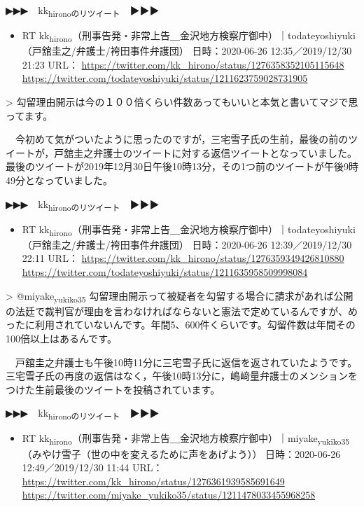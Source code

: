 \documentclass[]{ltjarticle}
\begin{document}
▶▶▶　kk\textsubscript{hironoのリツイート}　▶▶▶  

\begin{itemize}
\item RT kk\textsubscript{hirono}（刑事告発・非常上告＿金沢地方検察庁御中）｜todateyoshiyuki（戸舘圭之/弁護士/袴田事件弁護団） 日時：2020-06-26 12:35／2019/12/30 21:23 URL： \url{https://twitter.com/kk\_hirono/status/1276358352105115648} \url{https://twitter.com/todateyoshiyuki/status/1211623759028731905}
\end{itemize}

> 勾留理由開示は今の１００倍くらい件数あってもいいと本気と書いてマジで思ってます。  

　今初めて気がついたように思ったのですが，三宅雪子氏の生前，最後の前のツイートが，戸舘圭之弁護士のツイートに対する返信ツイートとなっていました。最後のツイートが2019年12月30日午後10時13分，その1つ前のツイートが午後9時49分となっていました。

▶▶▶　kk\textsubscript{hironoのリツイート}　▶▶▶  

\begin{itemize}
\item RT kk\textsubscript{hirono}（刑事告発・非常上告＿金沢地方検察庁御中）｜todateyoshiyuki（戸舘圭之/弁護士/袴田事件弁護団） 日時：2020-06-26 12:39／2019/12/30 22:11 URL： \url{https://twitter.com/kk\_hirono/status/1276359349426810880} \url{https://twitter.com/todateyoshiyuki/status/1211635958509998084}
\end{itemize}

> @miyake\textsubscript{yukiko35} 勾留理由開示って被疑者を勾留する場合に請求があれば公開の法廷で裁判官が理由を言わなければならないと憲法で定めているんですが、めったに利用されていないんです。年間5、600件くらいです。勾留件数は年間その100倍以上はあるんです。  

　戸舘圭之弁護士も午後10時11分に三宅雪子氏に返信を返されていたようです。三宅雪子氏の再度の返信はなく，午後10時13分に，嶋﨑量弁護士のメンションをつけた生前最後のツイートを投稿されています。

▶▶▶　kk\textsubscript{hironoのリツイート}　▶▶▶  

\begin{itemize}
\item RT kk\textsubscript{hirono}（刑事告発・非常上告＿金沢地方検察庁御中）｜miyake\textsubscript{yukiko35}（みやけ雪子（世の中を変えるために声をあげよう）） 日時：2020-06-26 12:49／2019/12/30 11:44 URL： \url{https://twitter.com/kk\_hirono/status/1276361939585691649} \url{https://twitter.com/miyake\_yukiko35/status/1211478033455968258}
\end{itemize}
\end{document}
